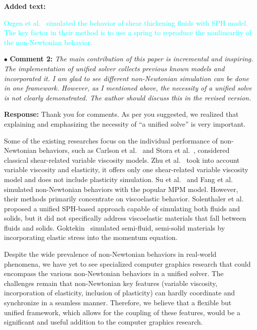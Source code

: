 \documentclass[12pt,a4paper]{article}
\newcommand{\revised}[1]{\textcolor{cyan}{#1}}
\begin{document}
\vspace{0.2cm}
\textbf{Added text:}

\revised{Ozgen et al.~\cite{Ozgen2019} simulated the behavior of shear thickening fluids with SPH model. The key factor in their method is to use a spring to reproduce the nonlinearity of the non-Newtonian behavior.}


\vspace{0.4cm}
\noindent$\bullet$ \enspace \textbf{Comment 2:}
\textit{The main contribution of this paper is incremental and inspiring. The implementation of unified solver collects previous known models and incorporated it. I am glad to see different non-Newtonian simulation can be done in one framework. However, as I mentioned above, the necessity of a unified solve is not clearly demonstrated. The author should discuss this in the revised version.}



\vspace{0.2cm}
\textbf{Response:}
Thank you for comments. As per you suggested, we realized that explaining and emphasizing the necessity of “a unified solve” is very important.

Some of the existing researches focus on the individual performance of non-Newtonian behaviors, such as Carlson et al.~\cite{Carlson2002} and Stora et al.~\cite{Stora1999}, considered classical shear-related variable viscosity models. Zhu et al.~\cite{Zhu2015-nonNewton} took into account variable viscosity and elasticity, it offers only one shear-related variable viscosity model and does not include plasticity simulation. Su et al.~\cite{Su2021} and Fang et al.~\cite{Fang2019-sillyRubber} simulated non-Newtonian behaviors with the popular MPM model. However, their methods primarily concentrate on viscoelastic behavior. Solenthaler et al.~\cite{Solenthaler2009-PCISPH} proposed a unified SPH-based approach capable of simulating both fluids and solids, but it did not specifically address viscoelastic materials that fall between fluids and solids. Goktekin~\cite{Goktekin2004} simulated semi-fluid, semi-solid materials by incorporating elastic stress into the momentum equation. 

Despite the wide prevalence of non-Newtonian behaviors in real-world phenomena, we have yet to see specialized computer graphics research that could encompass the various non-Newtonian behaviors in a unified solver. The challenges remain that non-Newtonian key features (variable viscosity, incorporation of elasticity, inclusion of plasticity) can hardly coordinate and synchronize in a seamless manner.   
 Therefore, we believe that a flexible but unified framework, which allows for the coupling of these features, would be a significant and useful addition to the computer graphics research.
\end{document}
